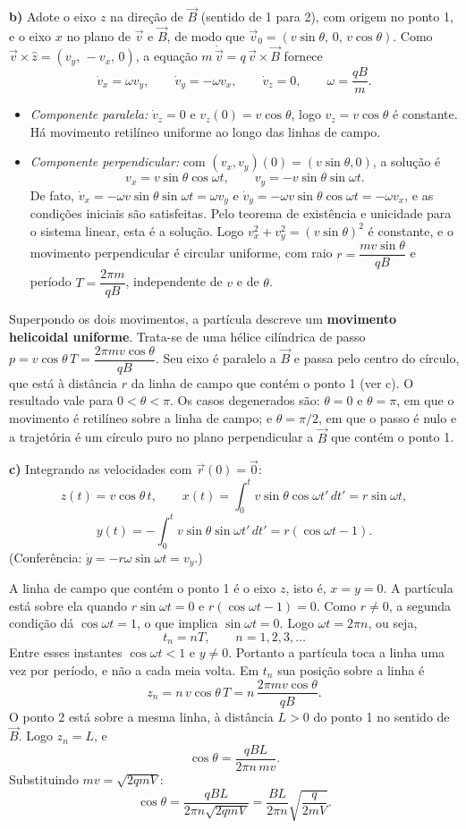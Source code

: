 \documentclass{article}%
\begin{document}
\textbf{b)} Adote o eixo $z$ na direção de $\vec{B}$ (sentido de 1 para 2), com origem no ponto 1, e o eixo $x$ no plano de $\vec{v}$ e $\vec{B}$, de modo que $\vec{v}_0=(v\sin\theta,\,0,\,v\cos\theta)$. Como $\vec{v}\times\hat{z}=(v_y,\,-v_x,\,0)$, a equação $m\,\dot{\vec{v}}=q\,\vec{v}\times\vec{B}$ fornece
\[
\dot v_x=\omega v_y,\qquad \dot v_y=-\omega v_x,\qquad \dot v_z=0,\qquad \omega=\frac{qB}{m}.
\]
\begin{itemize}
\item \textit{Componente paralela:} $\dot v_z=0$ e $v_z(0)=v\cos\theta$, logo $v_z=v\cos\theta$ é constante. Há movimento retilíneo uniforme ao longo das linhas de campo.
\item \textit{Componente perpendicular:} com $(v_x,v_y)(0)=(v\sin\theta,0)$, a solução é
\[
v_x=v\sin\theta\cos\omega t,\qquad v_y=-v\sin\theta\sin\omega t.
\]
De fato, $\dot v_x=-\omega v\sin\theta\sin\omega t=\omega v_y$ e $\dot v_y=-\omega v\sin\theta\cos\omega t=-\omega v_x$, e as condições iniciais são satisfeitas. Pelo teorema de existência e unicidade para o sistema linear, esta é a solução. Logo $v_x^2+v_y^2=(v\sin\theta)^2$ é constante, e o movimento perpendicular é circular uniforme, com raio $r=\dfrac{mv\sin\theta}{qB}$ e período $T=\dfrac{2\pi m}{qB}$, independente de $v$ e de $\theta$.
\end{itemize}
Superpondo os dois movimentos, a partícula descreve um \textbf{movimento helicoidal uniforme}. Trata-se de uma hélice cilíndrica de passo $p=v\cos\theta\,T=\dfrac{2\pi m v\cos\theta}{qB}$. Seu eixo é paralelo a $\vec{B}$ e passa pelo centro do círculo, que está à distância $r$ da linha de campo que contém o ponto 1 (ver c). O resultado vale para $0<\theta<\pi$. Os casos degenerados são: $\theta=0$ e $\theta=\pi$, em que o movimento é retilíneo sobre a linha de campo; e $\theta=\pi/2$, em que o passo é nulo e a trajetória é um círculo puro no plano perpendicular a $\vec{B}$ que contém o ponto 1.

\textbf{c)} Integrando as velocidades com $\vec{r}(0)=\vec{0}$:
\[
z(t)=v\cos\theta\,t,\qquad x(t)=\int_0^t v\sin\theta\cos\omega t'\,dt'=r\sin\omega t,
\]
\[
y(t)=-\int_0^t v\sin\theta\sin\omega t'\,dt'=r\left(\cos\omega t-1\right).
\]
(Conferência: $\dot y=-r\omega\sin\omega t=v_y$.)

A linha de campo que contém o ponto 1 é o eixo $z$, isto é, $x=y=0$. A partícula está sobre ela quando $r\sin\omega t=0$ e $r(\cos\omega t-1)=0$. Como $r\neq 0$, a segunda condição dá $\cos\omega t=1$, o que implica $\sin\omega t=0$. Logo $\omega t=2\pi n$, ou seja,
\[
t_n=nT,\qquad n=1,2,3,\dots
\]
Entre esses instantes $\cos\omega t<1$ e $y\neq 0$. Portanto a partícula toca a linha uma vez por período, e não a cada meia volta. Em $t_n$ sua posição sobre a linha é
\[
z_n=n\,v\cos\theta\,T=n\,\frac{2\pi m v\cos\theta}{qB}.
\]
O ponto 2 está sobre a mesma linha, à distância $L>0$ do ponto 1 no sentido de $\vec{B}$. Logo $z_n=L$, e
\[
\cos\theta=\frac{qBL}{2\pi n\,mv}.
\]
Substituindo $mv=\sqrt{2qmV}$:
\[
\cos\theta=\frac{qBL}{2\pi n\sqrt{2qmV}}=\frac{BL}{2\pi n}\sqrt{\frac{q}{2mV}}.
\]
\end{document}
